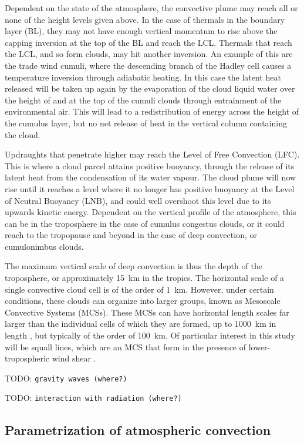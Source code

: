 \documentclass[11pt,a4paper]{article}
\newcommand{\todo}{TODO: \texttt}
\begin{document}
Dependent on the state of the atmosphere, the convective plume may reach all or none of the height levels given above. In the case of thermals in the boundary layer (BL), they may not have enough vertical momentum to rise above the capping inversion at the top of the BL and reach the LCL. Thermals that reach the LCL, and so form clouds, may hit another inversion. An example of this are the trade wind cumuli, where the descending branch of the Hadley cell causes a temperature inversion through adiabatic heating. In this case the latent heat released will be taken up again by the evaporation of the cloud liquid water over the height of and at the top of the cumuli clouds through entrainment of the environmental air. This will lead to a redistribution of energy across the height of the cumulus layer, but no net release of heat in the vertical column containing the cloud.

Updraughts that penetrate higher may reach the Level of Free Convection (LFC). This is where a cloud parcel attains positive buoyancy, through the release of its latent heat from the condensation of its water vapour. The cloud plume will now rise until it reaches a level where it no longer has positive buoyancy at the Level of Neutral Buoyancy (LNB), and could well overshoot this level due to its upwards kinetic energy. Dependent on the vertical profile of the atmosphere, this can be in the troposphere in the case of cumulus congestus clouds, or it could reach to the tropopause and beyond in the case of deep convection, or cumulonimbus clouds.

The maximum vertical scale of deep convection is thus the depth of the troposphere, or approximately \SI{15}{km} in the tropics. The horizontal scale of a single convective cloud cell is of the order of \SI{1}{km}. However, under certain conditions, these clouds can organize into larger groups, known as Mesoscale Convective Systems (MCSs). These MCSs can have horizontal length scales far larger than the individual cells of which they are formed, up to \SI{1000}{km} in length \parencite{redelsperger1997mesoscale}, but typically of the order of \SI{100}{km}. Of particular interest in this study will be squall lines, which are an MCS that form in the presence of lower-tropospheric wind shear \parencite{rotunno1988theory}.

\todo{gravity waves (where?)}

\todo{interaction with radiation (where?)}

\subsection{Parametrization of atmospheric convection}
\end{document}
